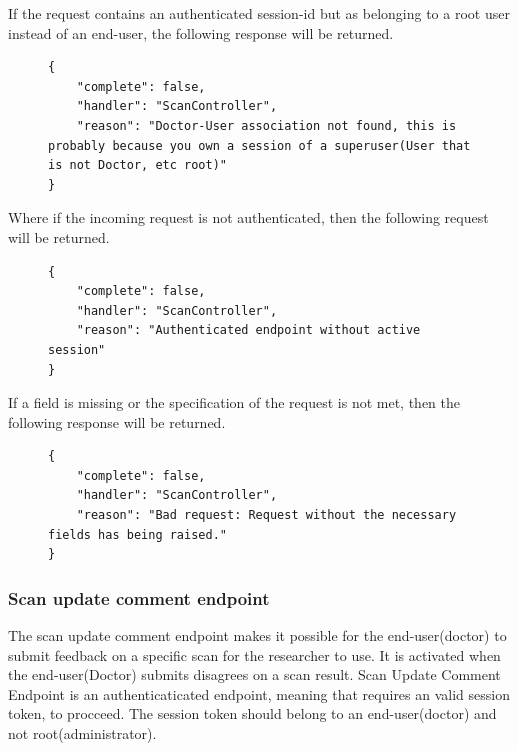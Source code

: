 					If the request contains an authenticated session-id but as belonging to a root user instead of an end-user, the following response will be returned.
					\begin{figure}[H]
						\iftrue
						\begin{lstlisting}[]
{
	"complete": false,
	"handler": "ScanController",
	"reason": "Doctor-User association not found, this is probably because you own a session of a superuser(User that is not Doctor, etc root)"
}
						\end{lstlisting}
					\end{figure}
					Where if the incoming request is not authenticated, then the following request will be returned.
					\begin{figure}[H]
						\iftrue
						\begin{lstlisting}[]
{
	"complete": false,
	"handler": "ScanController",
	"reason": "Authenticated endpoint without active session"
}
						\end{lstlisting}
					\end{figure}
					If a field is missing or the specification of the request is not met, then the following response will be returned.
					\begin{figure}[H]
						\iftrue
						\begin{lstlisting}[]
{
	"complete": false,
	"handler": "ScanController",
	"reason": "Bad request: Request without the necessary fields has being raised."
}					
						\end{lstlisting}
					\end{figure}
				\subsubsection{Scan update comment endpoint}
					
					The scan update comment endpoint makes it possible for the end-user(doctor) to submit feedback on a specific scan for the researcher to use. 
					It is activated when the end-user(Doctor) submits disagrees on a scan result. Scan Update Comment Endpoint is an authenticaticated endpoint, 
					meaning that requires an valid session token, to procceed.  The session token should belong to an end-user(doctor) and not root(administrator).
				

